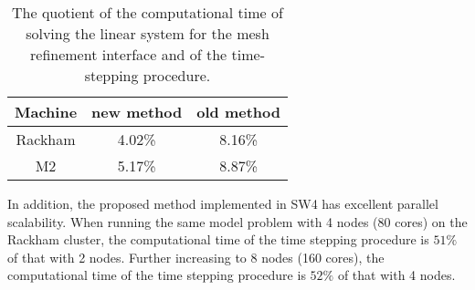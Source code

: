 \begin{table}[htbp]
	\begin{center}
		\begin{tabular}{|c|c|c|}
			\hline
			Machine   & new method & old method \\
			\hline
			Rackham & 4.02\% &  8.16\%\\
			\hline
			M2 &5.17\% & 8.87\%\\
			\hline 
		\end{tabular}
	\end{center}
		\caption{The quotient of the computational time of solving the linear system for the mesh refinement interface and of the time-stepping procedure.}\label{time}
\end{table} 

In addition, the proposed method implemented in SW4 has excellent parallel scalability. When running the same model problem with 4 nodes (80 cores) on the Rackham cluster, the computational time of the time stepping procedure is $51\%$ of that with 2 nodes. Further increasing to 8 nodes (160 cores), the computational time of the time stepping procedure is $52\%$ of that with 4 nodes.

